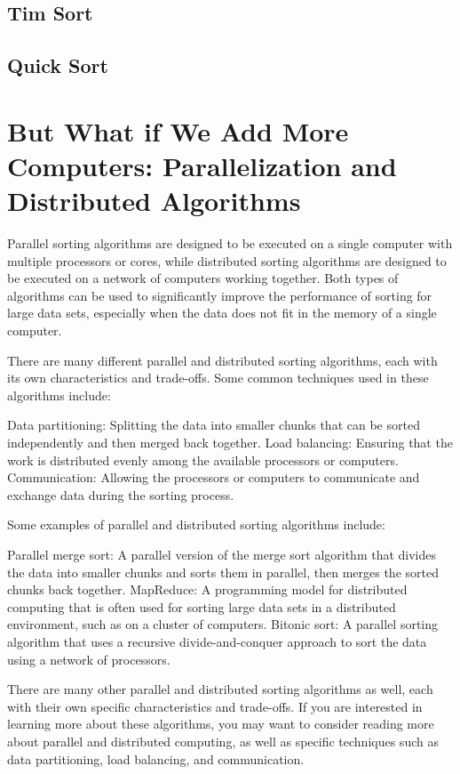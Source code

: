\subsection{Tim Sort}
\subsection{Quick Sort}
\section{But What if We Add More Computers: Parallelization and Distributed Algorithms}

Parallel sorting algorithms are designed to be executed on a single computer with multiple processors or cores, while distributed sorting algorithms are designed to be executed on a network of computers working together. Both types of algorithms can be used to significantly improve the performance of sorting for large data sets, especially when the data does not fit in the memory of a single computer.

There are many different parallel and distributed sorting algorithms, each with its own characteristics and trade-offs. Some common techniques used in these algorithms include:

Data partitioning: Splitting the data into smaller chunks that can be sorted independently and then merged back together.
Load balancing: Ensuring that the work is distributed evenly among the available processors or computers.
Communication: Allowing the processors or computers to communicate and exchange data during the sorting process.

Some examples of parallel and distributed sorting algorithms include:

Parallel merge sort: A parallel version of the merge sort algorithm that divides the data into smaller chunks and sorts them in parallel, then merges the sorted chunks back together.
MapReduce: A programming model for distributed computing that is often used for sorting large data sets in a distributed environment, such as on a cluster of computers.
Bitonic sort: A parallel sorting algorithm that uses a recursive divide-and-conquer approach to sort the data using a network of processors.

There are many other parallel and distributed sorting algorithms as well, each with their own specific characteristics and trade-offs. If you are interested in learning more about these algorithms, you may want to consider reading more about parallel and distributed computing, as well as specific techniques such as data partitioning, load balancing, and communication.


